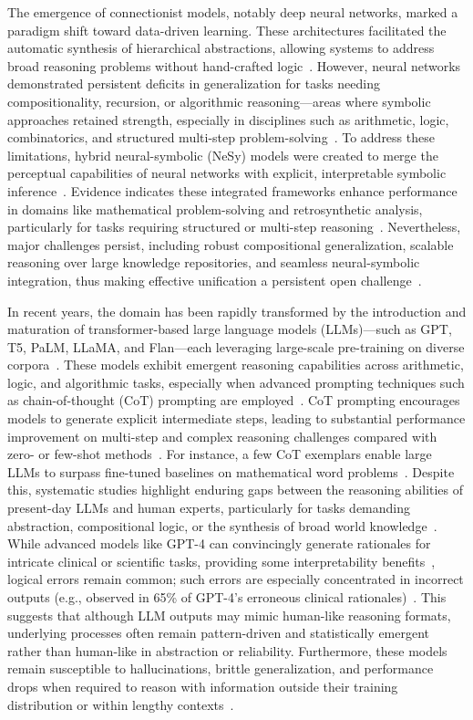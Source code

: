 \documentclass[sigconf]{acmart}
\begin{document}
The emergence of connectionist models, notably deep neural networks, marked a paradigm shift toward data-driven learning. These architectures facilitated the automatic synthesis of hierarchical abstractions, allowing systems to address broad reasoning problems without hand-crafted logic~\cite{ref54}. However, neural networks demonstrated persistent deficits in generalization for tasks needing compositionality, recursion, or algorithmic reasoning—areas where symbolic approaches retained strength, especially in disciplines such as arithmetic, logic, combinatorics, and structured multi-step problem-solving~\cite{ref42,ref49}. To address these limitations, hybrid neural-symbolic (NeSy) models were created to merge the perceptual capabilities of neural networks with explicit, interpretable symbolic inference~\cite{ref49,ref54}. Evidence indicates these integrated frameworks enhance performance in domains like mathematical problem-solving and retrosynthetic analysis, particularly for tasks requiring structured or multi-step reasoning~\cite{ref49}. Nevertheless, major challenges persist, including robust compositional generalization, scalable reasoning over large knowledge repositories, and seamless neural-symbolic integration, thus making effective unification a persistent open challenge~\cite{ref49,ref86}.

In recent years, the domain has been rapidly transformed by the introduction and maturation of transformer-based large language models (LLMs)—such as GPT, T5, PaLM, LLaMA, and Flan—each leveraging large-scale pre-training on diverse corpora~\cite{ref1,ref5,ref10,ref11,ref18,ref19,ref42,ref43,ref44,ref70,ref86}. These models exhibit emergent reasoning capabilities across arithmetic, logic, and algorithmic tasks, especially when advanced prompting techniques such as chain-of-thought (CoT) prompting are employed~\cite{ref10,ref11,ref42}. CoT prompting encourages models to generate explicit intermediate steps, leading to substantial performance improvement on multi-step and complex reasoning challenges compared with zero- or few-shot methods~\cite{ref10,ref11,ref42}. For instance, a few CoT exemplars enable large LLMs to surpass fine-tuned baselines on mathematical word problems~\cite{ref11}. Despite this, systematic studies highlight enduring gaps between the reasoning abilities of present-day LLMs and human experts, particularly for tasks demanding abstraction, compositional logic, or the synthesis of broad world knowledge~\cite{ref19,ref43,ref44}. While advanced models like GPT-4 can convincingly generate rationales for intricate clinical or scientific tasks, providing some interpretability benefits~\cite{ref1}, logical errors remain common; such errors are especially concentrated in incorrect outputs (e.g., observed in 65\% of GPT-4's erroneous clinical rationales)~\cite{ref1}. This suggests that although LLM outputs may mimic human-like reasoning formats, underlying processes often remain pattern-driven and statistically emergent rather than human-like in abstraction or reliability. Furthermore, these models remain susceptible to hallucinations, brittle generalization, and performance drops when required to reason with information outside their training distribution or within lengthy contexts~\cite{ref1,ref18,ref42,ref43,ref44,ref70}.
\end{document}
